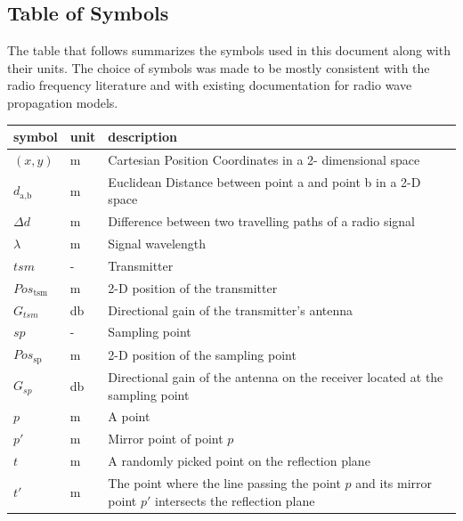 \documentclass[12pt]{article}
\begin{document}
\subsection{Table of Symbols}

The table that follows summarizes the symbols used in this document along with
their units.  The choice of symbols was made to be mostly consistent with the radio
frequency literature and with existing documentation for radio wave propagation
models.

\renewcommand{\arraystretch}{1.2}
\noindent \begin{longtable*}{l l p{12cm}} \toprule
\textbf{symbol} & \textbf{unit} & \textbf{description}\\
\midrule 
$(x,y)$ & \si[per-mode=symbol] {\metre} & Cartesian Position Coordinates in a 2-
dimensional space
\\
$d_\text{a,b}$ & \si[per-mode=symbol] {\metre} & Euclidean Distance between point 
a and point b in a 2-D space
\\
$\Delta d$ & \si[per-mode=symbol] {\metre} & Difference between two travelling 
paths of a radio signal
\\
$\lambda$ & \si[per-mode=symbol] {\metre} & Signal wavelength
\\
$tsm$ & \si[per-mode=symbol] {-} & Transmitter
\\
$Pos_\text{tsm}$ & \si[per-mode=symbol] {\metre} & 2-D position of the transmitter 
\\
$G_{tsm}$ & \si[per-mode=symbol] {\decibel} & Directional gain of the transmitter's 
antenna 
\\
$sp$ & \si[per-mode=symbol] {-} & Sampling point
\\
$Pos_\text{sp}$ & \si[per-mode=symbol] {\metre} & 2-D position of the sampling 
point 
\\
$G_{sp}$ & \si[per-mode=symbol] {\decibel} & Directional gain of the antenna on 
the receiver located at the sampling point
\\
$p$ & \si[per-mode=symbol] {m} & A point
\\
$p'$ & \si[per-mode=symbol] {m} & Mirror point of point $p$
\\
$t$ & \si[per-mode=symbol] {m} & A randomly picked point on the reflection plane
\\
$t'$ & \si[per-mode=symbol] {m} & The point where the line passing the point $p$
and its mirror point $p'$ intersects the reflection plane
\\

\end{longtable*}
\end{document}
